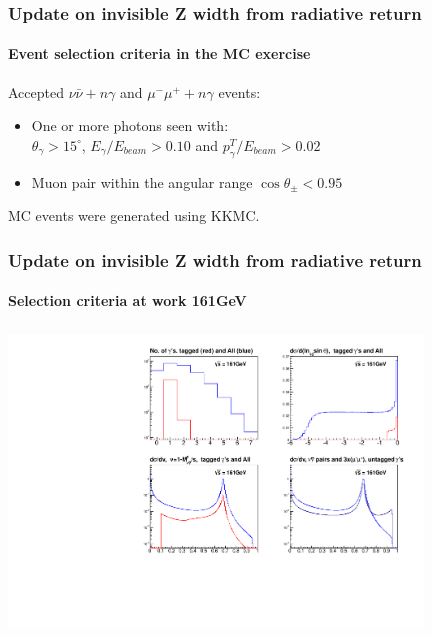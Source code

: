 \documentclass{beamer}
\newcommand{\crd}{\color{red}}
\begin{document}
\begin{frame}[fragile]
\frametitle{\bf Update on invisible Z width from radiative return}
\framesubtitle{\bf\crd\large Event selection criteria in the MC exercise}

Accepted $\nu\bar\nu+n\gamma$ and $\mu^-\mu^+ +n\gamma$ events:
\begin{itemize}
\item 
One or more photons seen with:\\
$\theta_\gamma >15^{\circ}$,
$E_\gamma/E_{beam}>0.10$ and $p^T_\gamma/E_{beam}>0.02$
\item
Muon pair within the angular range $\cos\theta_{\pm}<0.95$
\end{itemize}
MC events were generated using KKMC.

\end{frame}


\begin{frame}[fragile]
\frametitle{\bf Update on invisible Z width from radiative return}
\framesubtitle{\bf\large Selection criteria at work 161GeV}

\includegraphics[width=110mm,height=80mm]{./cFigInfo_E161.pdf}
\end{frame}
\end{document}
